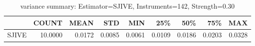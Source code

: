 \begin{table}[ht]
\centering
\caption{variance summary: Estimator=SJIVE, Instruments=142, Strength=0.30}
\begin{tabular}{lrrrrrrrr}
\toprule
 & COUNT & MEAN & STD & MIN & 25\% & 50\% & 75\% & MAX \\
\midrule
SJIVE & 10.0000 & 0.0172 & 0.0085 & 0.0061 & 0.0109 & 0.0186 & 0.0203 & 0.0328 \\
\bottomrule
\end{tabular}
\end{table}
